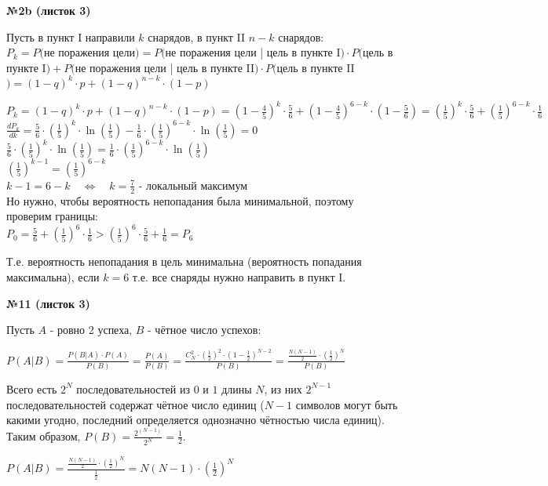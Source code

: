 \documentclass{article}
\newenvironment{task}{\begin{center}\fontsize{14}{14}\selectfont\bf}{\rm\fontsize{12}{12}\selectfont\end{center}}
\begin{document}
	\begin{task} 
		№2b (листок 3)
	\end{task}
	Пусть в пункт I направили $k$ снарядов, в пункт II $n - k$ снарядов: \\
	$P_k = P($не поражения цели$) = P($не поражения цели | цель в пункте I$)\cdot P($цель в пункте I$) + P($не поражения цели | цель в пункте II$)\cdot P($цель в пункте II$) = (1-q)^k\cdot p + (1-q)^{n-k}\cdot (1-p)$\\
	\begin{center}
	$P_k  =  (1-q)^k\cdot p + (1-q)^{n-k}\cdot (1-p) 
	= \left(1-\frac{4}{5}\right)^k\cdot \frac{5}{6} + \left(1-\frac{4}{5}\right)^{6-k}\cdot \left(1-\frac{5}{6}\right) 
	= \left(\frac{1}{5}\right)^k\cdot \frac{5}{6} + \left(\frac{1}{5}\right)^{6-k}\cdot \frac{1}{6}$ \\
	$\frac{dP_k}{dk} = \frac{5}{6} \cdot \left(\frac{1}{5}\right)^k \cdot \ln \left(\frac{1}{5}\right) - \frac{1}{6} \cdot \left(\frac{1}{5}\right)^{6-k}\cdot \ln \left(\frac{1}{5}\right) = 0 $ \\
	$\frac{5}{6} \cdot \left(\frac{1}{5}\right)^k \cdot \ln \left(\frac{1}{5}\right) = \frac{1}{6} \cdot \left(\frac{1}{5}\right)^{6-k}\cdot \ln \left(\frac{1}{5}\right)  $ \\
	$\left(\frac{1}{5}\right)^{k-1} = \left(\frac{1}{5}\right)^{6-k} $ \\
	$k-1 = 6-k \quad \Leftrightarrow \quad k = \frac{7}{2} $ - локальный максимум \\
	Но нужно, чтобы вероятность непопадания была минимальной, поэтому проверим границы: \\
	$P_0 = \frac{5}{6} + \left(\frac{1}{5}\right)^6\cdot \frac{1}{6} > \left(\frac{1}{5}\right)^6\cdot \frac{5}{6} + \frac{1}{6} = P_6$ \\
	\end{center}
	Т.е. вероятность непопадания в цель минимальна (вероятность попадания максимальна), если $k=6$ т.е. все снаряды нужно направить в пункт I. 
	
	\newpage
	
	\begin{task} 
		№11 (листок 3)
	\end{task}
	Пусть $A$ - ровно 2 успеха, $B$ - чётное число успехов:\\
	\begin{center}
	$P(A|B) = \frac{P(B|A)\cdot P(A)}{P(B)} = \frac{P(A)}{P(B)} 
	= \frac{C_N^2\cdot \left( \frac{1}{2}\right)^2\cdot \left(1 - \frac{1}{2}\right)^{N-2}}{P(B)} 
	= \frac{\frac{N(N-1)}{2} \cdot \left( \frac{1}{2}\right)^N}{P(B)} $ \\
	\end{center}
	Всего есть $2^N$ последовательностей из $0$ и $1$ длины $N$, из них $2^{N-1}$ последовательностей содержат чётное число единиц ($N-1$ символов могут быть какими угодно, последний определяется однозначно чётностью числа единиц). Таким образом, $P(B) = \frac{2^(N-1)}{2^N} = \frac{1}{2}$.\\
	\begin{center}
	$P(A|B) = \frac{\frac{N(N-1)}{2} \cdot \left( \frac{1}{2}\right)^N}{\frac{1}{2}}
			= N(N-1) \cdot \left( \frac{1}{2}\right)^N$
	\end{center}
	
	
\end{document}
